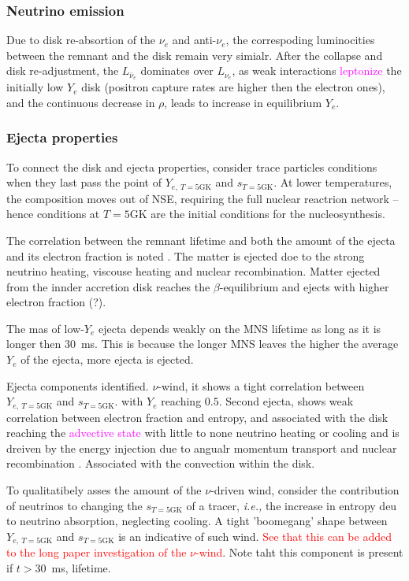 \documentclass[11pt,a4paper,headinclude=true,DIV=14,BCOR=8mm,chapterprefix,listof=totoc,twoside,openright,abstracton]{scrbook}
\newcommand{\red}[1]{\textcolor{red}{#1}}
\newcommand{\magenta}[1]{\textcolor{magenta}{#1}} %
\begin{document}
\subsubsection{Neutrino emission}

Due to disk re-absortion of the $\nu_e$ and anti-$\nu_e$, the correspoding luminocities between the remnant and the disk remain very simialr. 
After the collapse and disk re-adjustment, the $L_{\bar{\nu}_e}$ dominates over $L_{\nu_e}$, as weak interactions \magenta{leptonize} the initially low $Y_e$ disk (positron capture rates are higher then the electron ones), and the continuous decrease in $\rho$, leads to increase in equilibrium $Y_e$.

\subsubsection{Ejecta properties}

To connect the disk and ejecta properties, consider trace particles conditions when they last pass the point of $Y_{e,\:T=5\text{GK}}$ and $s_{T=5\text{GK}}$. At lower temperatures, the composition moves out of NSE, requiring the full nuclear reactrion network -- hence conditions at $T=5$GK are the initial conditions for the nucleosynthesis.

The correlation between the remnant lifetime and both the amount of the ejecta and its electron fraction is noted \cite{(Metzger and Fernandez, 2014)}. The matter is ejected doe to the strong neutrino heating, viscouse heating and nuclear recombination. Matter ejected from the innder accretion disk reaches the $\beta$-equilibrium and ejects with higher electron fraction (?). 

The mas of low-$Y_e$ ejecta depends weakly on the MNS lifetime as long as it is longer then $30$~ms. This is because the longer MNS leaves the higher the average $Y_e$ of the ejecta, more ejecta is ejected. 

Ejecta components identified. $\nu$-wind, it shows a tight correlation between $Y_{e,\:T=5\text{GK}}$ and $s_{T=5\text{GK}}$. with $Y_e$ reaching $0.5$. 
Second ejecta, shows weak correlation between electron fraction and entropy, and associated with the disk reaching the \magenta{advective state} with little to none neutrino heating or cooling and is dreiven by the energy injection due to angualr momentum transport and nuclear recombination \cite{Metzger and Fernandez, 2014}. Associated with the convection within the disk.

To qualitatibely asses the amount of the $\nu$-driven wind, consider the contribution of neutrinos to changing the $s_{T=5\text{GK}}$ of a tracer, \textit{i.e.,} the increase in entropy deu to neutrino absorption, neglecting cooling. A tight 'boomegang' shape between $Y_{e,\:T=5\text{GK}}$ and $s_{T=5\text{GK}}$ is an indicative of such wind. \red{See that this can be added to the long paper investigation of the $\nu$-wind}.
Note taht this component is present if $t>30$~ms, lifetime. 
\end{document}

